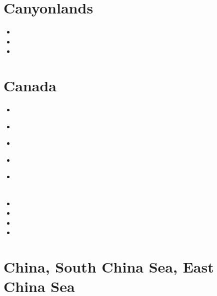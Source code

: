 \section{Canyonlands}

\begin{small}
\begin{itemize}
\item[\nineteenninetyfour]
\item[\twothousandtwo]
\item[\twothousandthree]
\end{itemize}
\end{small}

\section{Canada}

\begin{small}
\begin{itemize}
\item[\nineteeneighty]
\item[\nineteenninetythree]
 \\ 
\item[\nineteenninetyeight]
\item[\nineteenninetynine]
 \\
\item[\twothousandten]
 \\
 \\
\item[\twothousandthirteen]
\item[\twothousandthirteen]
\item[\twothousandtwenty]
\item[\twothousandtwentythree]
\end{itemize}
\end{small}

\section{China, South China Sea, East China Sea}

